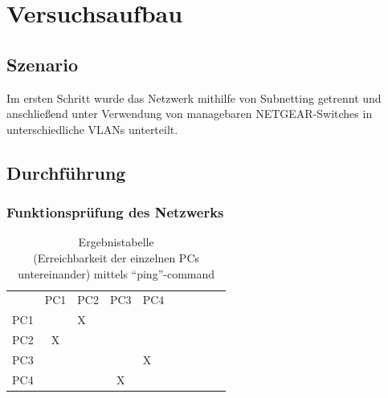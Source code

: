 \newpage
\section{Versuchsaufbau}

    \subsection{Szenario}

    Im ersten Schritt wurde das Netzwerk mithilfe von Subnetting getrennt und anschließend unter Verwendung von managebaren NETGEAR-Switches
    in unterschiedliche VLANs unterteilt.

    \subsection{Durchführung}

        \subsubsection{Funktionsprüfung des Netzwerks}
        \begin{table}[H]
            \centering
            \begin{tabular}{l|c|l|c|l|c|l|c|l|c|}
            \multicolumn{1}{l}{} & \multicolumn{1}{l}{PC1} & \multicolumn{1}{l}{PC2} & \multicolumn{1}{l}{PC3} & \multicolumn{1}{l}{PC4}  \\ 
            \cline{2-5}
            PC1&&X&& \\ 
            \cline{2-5}
            PC2&X&&& \\
            \cline{2-5}
            PC3&&&&X \\
            \cline{2-5}
            PC4&&&X& \\
            \cline{2-5}
            \end{tabular}
            \caption{Ergebnistabelle\\ (Erreichbarkeit der einzelnen PCs untereinander) mittels "`ping"'-command}
        \end{table}
        
